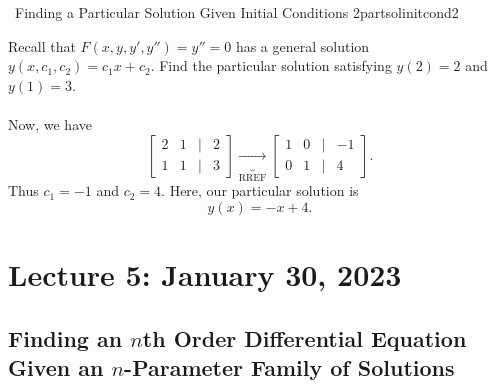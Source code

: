         \begin{example}{\Difficulty\,\Difficulty\,\,Finding a Particular Solution Given Initial Conditions 2}{partsolinitcond2}

            Recall that \(F(x,y,y',y'')=y''=0\) has a general solution \(y(x,c_1,c_2)=c_1x+c_2\). Find the particular solution satisfying \(y(2)=2\) and \(y(1)=3\).
            \\
            \\
            Now, we have
            \begin{equation*}
                \begin{bmatrix}
                    2 & 1 & | & 2 \\
                    1 & 1 & | & 3
                \end{bmatrix}\underbrace{\to}_{\text{RREF}}\begin{bmatrix}
                    1 & 0 & | & -1 \\
                    0 & 1 & | & 4 
                \end{bmatrix}.
            \end{equation*}
            Thus \(c_1=-1\) and \(c_2=4\). Here, our particular solution is
            \begin{equation*}
                y(x)=-x+4.
            \end{equation*}
            
        \end{example}

    \pagebreak

\section{Lecture 5: January 30, 2023}

    \DOTHISLATER

    \subsection{Finding an \(n\)th Order Differential Equation Given an \(n\)-Parameter Family of Solutions}

